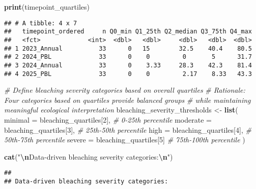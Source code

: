 \documentclass[
]{article}
\newenvironment{Shaded}{\begin{snugshade}}{\end{snugshade}}
\newcommand{\AttributeTok}[1]{\textcolor[rgb]{0.13,0.29,0.53}{#1}}
\newcommand{\CommentTok}[1]{\textcolor[rgb]{0.56,0.35,0.01}{\textit{#1}}}
\newcommand{\DecValTok}[1]{\textcolor[rgb]{0.00,0.00,0.81}{#1}}
\newcommand{\FunctionTok}[1]{\textcolor[rgb]{0.13,0.29,0.53}{\textbf{#1}}}
\newcommand{\NormalTok}[1]{#1}
\newcommand{\OtherTok}[1]{\textcolor[rgb]{0.56,0.35,0.01}{#1}}
\newcommand{\SpecialCharTok}[1]{\textcolor[rgb]{0.81,0.36,0.00}{\textbf{#1}}}
\newcommand{\StringTok}[1]{\textcolor[rgb]{0.31,0.60,0.02}{#1}}
\begin{document}
\begin{Shaded}
\begin{Highlighting}[]
\FunctionTok{print}\NormalTok{(timepoint\_quartiles)}
\end{Highlighting}
\end{Shaded}

\begin{verbatim}
## # A tibble: 4 x 7
##   timepoint_ordered     n Q0_min Q1_25th Q2_median Q3_75th Q4_max
##   <fct>             <int>  <dbl>   <dbl>     <dbl>   <dbl>  <dbl>
## 1 2023_Annual          33      0   15        32.5    40.4    80.5
## 2 2024_PBL             33      0    0         0       5      31.7
## 3 2024_Annual          33      0    3.33     28.3    42.3    81.4
## 4 2025_PBL             33      0    0         2.17    8.33   43.3
\end{verbatim}

\begin{Shaded}
\begin{Highlighting}[]
\CommentTok{\# Define bleaching severity categories based on overall quartiles}
\CommentTok{\# Rationale: Four categories based on quartiles provide balanced groups}
\CommentTok{\# while maintaining meaningful ecological interpretation}
\NormalTok{bleaching\_severity\_thresholds }\OtherTok{\textless{}{-}} \FunctionTok{list}\NormalTok{(}
  \AttributeTok{minimal =}\NormalTok{ bleaching\_quartiles[}\DecValTok{2}\NormalTok{],      }\CommentTok{\# 0{-}25th percentile}
  \AttributeTok{moderate =}\NormalTok{ bleaching\_quartiles[}\DecValTok{3}\NormalTok{],     }\CommentTok{\# 25th{-}50th percentile  }
  \AttributeTok{high =}\NormalTok{ bleaching\_quartiles[}\DecValTok{4}\NormalTok{],         }\CommentTok{\# 50th{-}75th percentile}
  \AttributeTok{severe =}\NormalTok{ bleaching\_quartiles[}\DecValTok{5}\NormalTok{]        }\CommentTok{\# 75th{-}100th percentile}
\NormalTok{)}

\FunctionTok{cat}\NormalTok{(}\StringTok{"}\SpecialCharTok{\textbackslash{}n}\StringTok{Data{-}driven bleaching severity categories:}\SpecialCharTok{\textbackslash{}n}\StringTok{"}\NormalTok{)}
\end{Highlighting}
\end{Shaded}

\begin{verbatim}
## 
## Data-driven bleaching severity categories:
\end{verbatim}

\begin{Shaded}
\end{Shaded}
\end{document}
